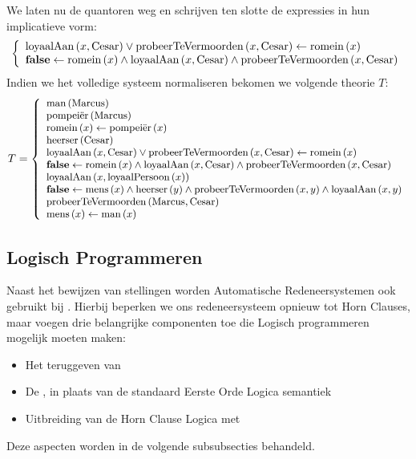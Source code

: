 \begin{leftbar}
\begin{equation}
\end{equation}
We laten nu de quantoren weg en schrijven ten slotte de expressies in hun implicatieve vorm:
\begin{equation}
\left\{\begin{array}{l}
\mbox{loyaalAan}\left( x,\mbox{Cesar} \right)\vee\mbox{probeerTeVermoorden}\left( x,\mbox{Cesar} \right)\leftarrow\mbox{romein}\left( x \right)\\
\mbox{\bf false}\leftarrow\mbox{romein}\left( x \right)\wedge\mbox{loyaalAan}\left( x,\mbox{Cesar} \right)\wedge\mbox{probeerTeVermoorden}\left( x,\mbox{Cesar} \right)
\end{array}\right.
\end{equation}
Indien we het volledige systeem normaliseren bekomen we volgende theorie $T$:
\begin{equation}
\small{
T=\left\{
\begin{array}{l}
\ensuremath{\mbox{man}\left( \mbox{Marcus} \right)}\\
\ensuremath{\mbox{pompei\"er}\left( \mbox{Marcus} \right)}\\
\ensuremath{\mbox{romein}\left( x \right)}\leftarrow\ensuremath{\mbox{pompei\"er}\left( x \right)}\\
\ensuremath{\mbox{heerser}\left( \mbox{Cesar} \right)}\\
\ensuremath{\mbox{loyaalAan}\left( x,\mbox{Cesar} \right)}\vee\ensuremath{\mbox{probeerTeVermoorden}\left( x,\mbox{Cesar} \right)}\leftarrow\ensuremath{\mbox{romein}\left( x \right)}\\
\mbox{\bf false}\leftarrow\ensuremath{\mbox{romein}\left( x \right)}\wedge\ensuremath{\mbox{loyaalAan}\left( x,\mbox{Cesar} \right)}\wedge\ensuremath{\mbox{probeerTeVermoorden}\left( x,\mbox{Cesar} \right)}\\
\ensuremath{\mbox{loyaalAan}\left( x,\mbox{loyaalPersoon}\left( x \right) \right)}\\
\mbox{\bf false}\leftarrow\ensuremath{\mbox{mens}\left( x \right)}\wedge\ensuremath{\mbox{heerser}\left( y \right)}\wedge\ensuremath{\mbox{probeerTeVermoorden}\left( x,y \right)}\wedge\ensuremath{\mbox{loyaalAan}\left( x,y \right)}\\
\ensuremath{\mbox{probeerTeVermoorden}\left( \mbox{Marcus},\mbox{Cesar} \right)}\\
\ensuremath{\mbox{mens}\left( x \right)}\leftarrow\ensuremath{\mbox{man}\left( x \right)}
\end{array}\right.}
\end{equation}
\end{leftbar}
\subsection{Logisch Programmeren}
Naast het bewijzen van stellingen worden Automatische Redeneersystemen ook gebruikt bij . Hierbij beperken we ons redeneersysteem opnieuw tot Horn Clauses, maar voegen drie belangrijke componenten toe die Logisch programmeren mogelijk moeten maken:
\begin{itemize}
 \item Het teruggeven van 
 \item De , in plaats van de standaard Eerste Orde Logica semantiek
 \item Uitbreiding van de Horn Clause Logica met 
\end{itemize}
Deze aspecten worden in de volgende subsubsecties behandeld.
